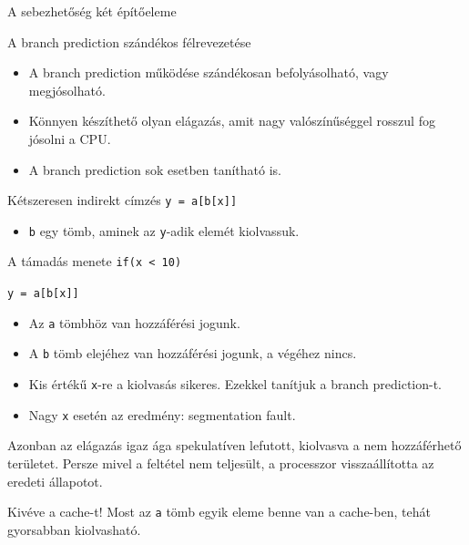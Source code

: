 \documentclass[12 pt]{beamer}
\begin{document}
\begin{frame}{A sebezhetőség két építőeleme}
  \begin{block}{A branch prediction szándékos félrevezetése}
    \begin{itemize}
      \item{A branch prediction működése szándékosan befolyásolható, vagy megjósolható.}
      \item{Könnyen készíthető olyan elágazás, amit nagy valószínűséggel rosszul fog jósolni a CPU.}
      \item{A branch prediction sok esetben tanítható is.}
    \end{itemize}
  \end{block}

  \begin{block}{Kétszeresen indirekt címzés}
    \texttt{y = a[b[x]]}
    \begin{itemize}
      \item{\texttt{b} egy tömb, aminek az \texttt{y}-adik elemét kiolvassuk.}
    \end{itemize}
  \end{block}
\end{frame}

\begin{frame}{A támadás menete}
  \texttt{if(x < 10)}

  \texttt{\qquad y = a[b[x]]}
 
  \bigskip

  \begin{itemize}
    \item{Az \texttt{a} tömbhöz van hozzáférési jogunk.}
    \item{A \texttt{b} tömb elejéhez van hozzáférési jogunk, a végéhez nincs.}
    \item{Kis értékű \texttt{x}-re a kiolvasás sikeres. Ezekkel tanítjuk a branch prediction-t.}
    \item{Nagy \texttt{x} esetén az eredmény: segmentation fault.}
  \end{itemize}

  \bigskip

  Azonban az elágazás igaz ága spekulatíven lefutott, kiolvasva a nem hozzáférhető területet. Persze mivel
  a feltétel nem teljesült, a processzor visszaállította az eredeti állapotot.

  \begin{alertblock}{}
    Kivéve a cache-t! Most az \texttt{a} tömb egyik eleme benne van a cache-ben, tehát gyorsabban
    kiolvasható.
  \end{alertblock}

\end{frame}
\end{document}

